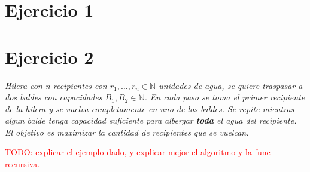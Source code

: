 \documentclass[12pt, a4paper]{report}
\theoremstyle{definition} %
\begin{document}
\section*{Ejercicio 1}

\section*{Ejercicio 2}

\textit{Hilera con n recipientes con $r_1, \ldots, r_n \in \mathbb{N}$ unidades de agua, se quiere traspasar a dos baldes con capacidades $B_1, B_2 \in \mathbb{N}$. En cada paso se toma el primer recipiente de la hilera y se vuelva completamente en uno de los baldes. Se repite mientras algun balde tenga capacidad suficiente para albergar \textbf{toda} el agua del recipiente. El objetivo es maximizar la cantidad de recipientes que se vuelcan.}

\textcolor{red}{TODO: explicar el ejemplo dado, y explicar mejor el algoritmo y la func recursiva.}
\end{document}
